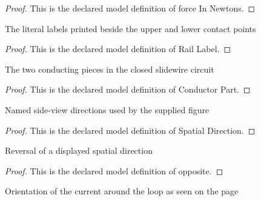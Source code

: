 \begin{proof}
  This is the declared model definition of force In Newtons.
\end{proof}
\begin{definition}
  \label{def:physics:phyx-mini-0937:phyxminiproblems-problemphyxmini0937-raillabel}
  The literal labels printed beside the upper and lower contact points
\end{definition}
\begin{proof}
  This is the declared model definition of Rail Label.
\end{proof}
\begin{definition}
  \label{def:physics:phyx-mini-0937:phyxminiproblems-problemphyxmini0937-conductorpart}
  The two conducting pieces in the closed slidewire circuit
\end{definition}
\begin{proof}
  This is the declared model definition of Conductor Part.
\end{proof}
\begin{definition}
  \label{def:physics:phyx-mini-0937:phyxminiproblems-problemphyxmini0937-spatialdirection}
  Named side-view directions used by the supplied figure
\end{definition}
\begin{proof}
  This is the declared model definition of Spatial Direction.
\end{proof}
\begin{definition}[opposite]
  \label{def:physics:phyx-mini-0937:phyxminiproblems-problemphyxmini0937-spatialdirection-opposite}
  Reversal of a displayed spatial direction
\end{definition}
\begin{proof}
  This is the declared model definition of opposite.
\end{proof}
\begin{definition}
  \label{def:physics:phyx-mini-0937:phyxminiproblems-problemphyxmini0937-circuitsense}
  Orientation of the current around the loop as seen on the page
\end{definition}
